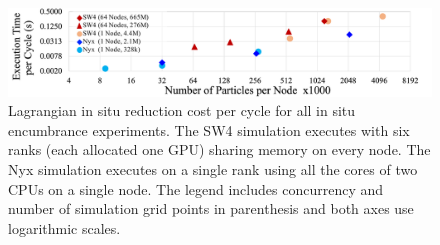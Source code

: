 \begin{figure}[!b]
\centering
\vspace{-4mm}
\includegraphics[width=\linewidth]{Images/InSituCost_Stretch2.pdf}
\vspace{-5mm}
\caption{Lagrangian in situ reduction cost per cycle for all in situ encumbrance experiments. The SW4 simulation executes with six ranks (each allocated one GPU) sharing memory on every node. The Nyx simulation executes on a single rank using all the cores of two CPUs on a single node. The legend includes concurrency and number of simulation grid points in parenthesis and both axes use logarithmic scales.} 
\vspace{-5mm}
\label{fig:insitucost}
\end{figure}

